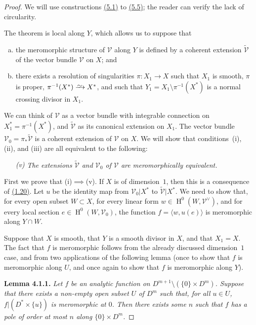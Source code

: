 \documentclass{report}
\newenvironment{itenv}[1]
  {\phantomsection\par\medskip\noindent\textbf{#1.}\itshape}
  {\medskip}
\renewcommand{\cal}[1]{{\mathcal{#1}}}
\newcommand{\simto}{\xrightarrow{\raisebox{-0.7ex}[0ex][0ex]{$\sim$}}}
\DeclareMathOperator{\HH}{H}
\begin{document}
\begin{proof}
  We will use constructions \hyperref[II.5.1]{(5.1)} to \hyperref[II.5.5]{(5.5)}; the reader can verify the lack of circularity.

  The theorem is local along $Y$, which allows us to suppose that
  \begin{enumerate}[a)]
    \item the meromorphic structure of $\cal{V}$ along $Y$ is defined by a coherent extension $\widetilde{\cal{V}}$ of the vector bundle $\cal{V}$ on $X$; and
    \item there exists a resolution of singularities $\pi\colon X_1\to X$ such that $X_1$ is smooth, $\pi$ is proper, $\pi^{-1}(X^*)\simto X^*$, and such that $Y_1=X_1\setminus\pi^{-1}(X^*)$ is a normal crossing divisor in $X_1$.
  \end{enumerate}

  We can think of $\cal{V}$ as a vector bundle with integrable connection on $X_1^*=\pi^{-1}(X^*)$, and $\widetilde{\cal{V}}$ as its canonical extension on $X_1$.
  The vector bundle $\cal{V}_0=\pi_*\widetilde{\cal{V}}$ is a coherent extension of $\cal{V}$ on $X$.
  We will show that conditions~(i), (ii), and (iii) are all equivalent to the following:
  \begin{enumerate}
    \item[\textit{(v)}] \textit{The extensions $\widetilde{\cal{V}}$ and $\cal{V}_0$ of $\cal{V}$ are meromorphically equivalent.}
  \end{enumerate}

  First we prove that \mbox{(i)$\implies$(v)}.
  If $X$ is of dimension~$1$, then this is a consequence of \hyperref[II.1.20]{(1.20)}.
  Let $u$ be the identity map from $\cal{V}_0|X^*$ to $\widetilde{\cal{V}}|X^*$.
  We need to show that, for every open subset $W\subset X$, for every linear form $w\in\HH^0(W,\cal{V}^\vee)$, and for every local section $e\in\HH^0(W,\cal{V}_0)$, the function $f=\langle w,u(e)\rangle$ is meromorphic along $Y\cap W$.

  Suppose that $X$ is smooth, that $Y$ is a smooth divisor in $X$, and that $X_1=X$.
  The fact that $f$ is meromorphic follows from the already discussed dimension~$1$ case, and from two applications of the following lemma (once to show that $f$ is meromorphic along $U$, and once again to show that $f$ is meromorphic along $Y$).

  \begin{itenv}{Lemma 4.1.1}
  \label{II.4.1.1}
    Let $f$ be an analytic function on $D^{m+1}\setminus(\{0\}\times D^m)$.
    Suppose that there exists a non-empty open subset $U$ of $D^m$ such that, for all $u\in U$, $f|(D^*\times\{u\})$ is meromorphic at $0$.
    Then there exists some $n$ such that $f$ has a pole of order at most $n$ along $\{0\}\times D^m$.
  \end{itenv}


\end{proof}
\end{document}
